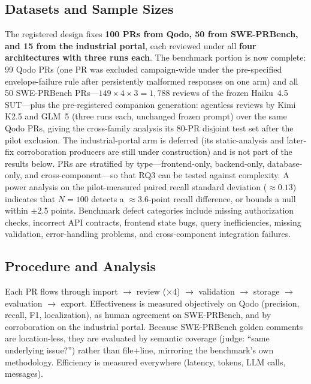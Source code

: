 \documentclass[conference]{IEEEtran}
\begin{document}
\subsection{Datasets and Sample Sizes}
The registered design fixes \textbf{100 PRs from Qodo, 50 from
SWE-PRBench, and 15 from the industrial portal}, each reviewed under all
\textbf{four architectures with three runs each}. The benchmark portion is
now complete: 99 Qodo PRs (one PR was excluded campaign-wide under the
pre-specified envelope-failure rule after persistently malformed responses
on one arm) and all 50 SWE-PRBench PRs---$149 \times 4 \times 3 = 1{,}788$
reviews of the frozen Haiku~4.5 SUT---plus the pre-registered companion
generation: agentless reviews by Kimi K2.5 and GLM~5 (three runs each,
unchanged frozen prompt) over the same Qodo PRs, giving the cross-family
analysis its 80-PR disjoint test set after the pilot exclusion. The
industrial-portal arm is deferred (its static-analysis and later-fix
corroboration producers are still under construction) and is not part of
the results below.
PRs are stratified by type---frontend-only, backend-only, database-only, and
cross-component---so that RQ3 can be tested against complexity. A power
analysis on the pilot-measured paired recall standard deviation
($\approx 0.13$) indicates that $N{=}100$ detects a $\approx$3.6-point recall
difference, or bounds a null within $\pm$2.5 points. Benchmark defect
categories include missing authorization checks, incorrect API contracts,
frontend state bugs, query inefficiencies, missing validation,
error-handling problems, and cross-component integration failures.

\subsection{Procedure and Analysis}
Each PR flows through import $\rightarrow$ review ($\times 4$) $\rightarrow$
validation $\rightarrow$ storage $\rightarrow$ evaluation $\rightarrow$
export. Effectiveness is measured objectively on Qodo (precision, recall,
F1, localization), as human agreement on SWE-PRBench, and by corroboration
on the industrial portal. Because SWE-PRBench golden comments are
location-less, they are evaluated by semantic coverage (judge: ``same
underlying issue?'') rather than file+line, mirroring the benchmark's own
methodology. Efficiency is measured everywhere (latency, tokens, LLM calls,
messages).
\end{document}
